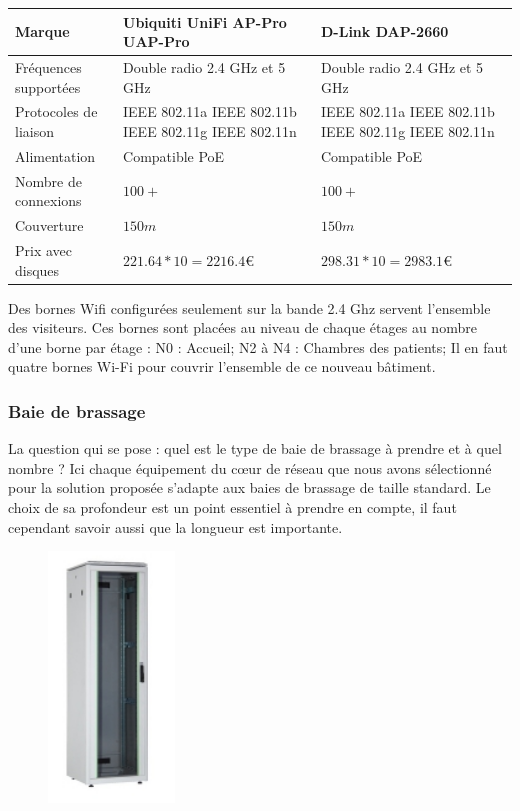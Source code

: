     \begin{center}
        \begin{tabular}{|l|p{5cm}|p{5cm}|}
          \hline
            Marque  & Ubiquiti UniFi AP-Pro UAP-Pro
    &   D-Link DAP-2660
 \\
          \hline
Fréquences supportées
  &
Double radio 2.4 GHz et 5 GHz
    &
Double radio 2.4 GHz et 5 GHz
 \\
          \hline
Protocoles de liaison
  & IEEE 802.11a
IEEE 802.11b
IEEE 802.11g
IEEE 802.11n
    & IEEE 802.11a
IEEE 802.11b
IEEE 802.11g
IEEE 802.11n
 \\
          \hline
            Alimentation  & Compatible PoE & Compatible PoE
                  \\
          \hline
            Nombre de connexions  & $100+$ & $100+$
                  \\
          \hline
            Couverture  & $150m$ & $150m$
                  \\
        \hline
            Prix avec disques &
$221.64 * 10 =2216.4 \euro   $
    &
$298.31 * 10 = 2983.1 \euro   $
 \\
          \hline
        \end{tabular}
    \end{center}

Des bornes Wifi configurées seulement sur la bande 2.4 Ghz servent l'ensemble des visiteurs. Ces bornes sont placées au niveau de chaque étages au nombre d'une borne par étage :
N0 : Accueil;
N2 à N4 : Chambres des patients;
Il en faut quatre bornes Wi-Fi  pour couvrir l'ensemble de ce nouveau bâtiment.



\subsubsection{Baie de brassage}


La question qui se pose : quel est le type de baie de brassage à prendre et à quel nombre ?
Ici chaque équipement du cœur de réseau que nous avons sélectionné pour la solution proposée s'adapte aux baies de brassage de taille standard.
Le choix de sa profondeur est un point essentiel à prendre en compte, il faut cependant savoir aussi que la longueur est importante.

\begin{figure}[!ht]
    \center
    \includegraphics[width=0.3\textwidth]{./images/24.png}
\end{figure}

